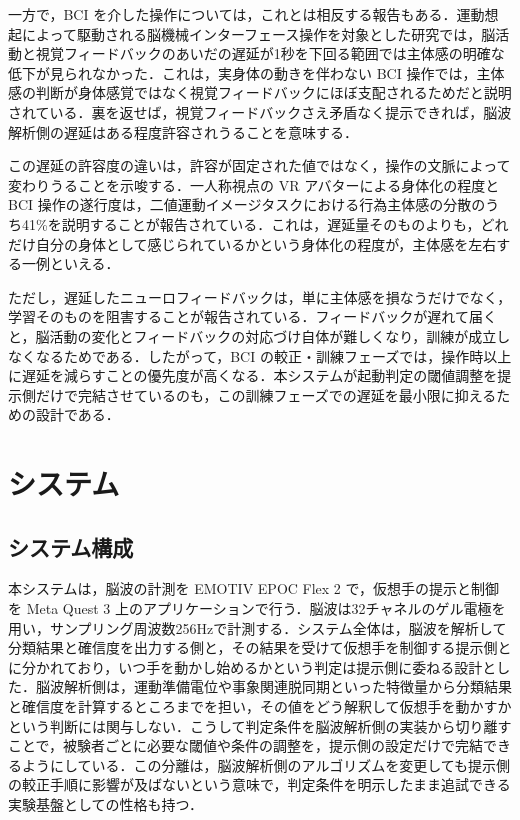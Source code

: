 \documentclass[twoside]{wiss}
\begin{document}
一方で，BCI を介した操作については，これとは相反する報告もある．運動想起によって駆動される脳機械インターフェース操作を対象とした研究では，脳活動と視覚フィードバックのあいだの遅延が1秒を下回る範囲では主体感の明確な低下が見られなかった．これは，実身体の動きを伴わない BCI 操作では，主体感の判断が身体感覚ではなく視覚フィードバックにほぼ支配されるためだと説明されている\cite{evans2015}．裏を返せば，視覚フィードバックさえ矛盾なく提示できれば，脳波解析側の遅延はある程度許容されうることを意味する．

この遅延の許容度の違いは，許容が固定された値ではなく，操作の文脈によって変わりうることを示唆する．一人称視点の VR アバターによる身体化の程度と BCI 操作の遂行度は，二値運動イメージタスクにおける行為主体感の分散のうち41\%を説明することが報告されている\cite{ziadeh2021}．これは，遅延量そのものよりも，どれだけ自分の身体として感じられているかという身体化の程度が，主体感を左右する一例といえる．

ただし，遅延したニューロフィードバックは，単に主体感を損なうだけでなく，学習そのものを阻害することが報告されている\cite{belinskaia2020}．フィードバックが遅れて届くと，脳活動の変化とフィードバックの対応づけ自体が難しくなり，訓練が成立しなくなるためである．したがって，BCI の較正・訓練フェーズでは，操作時以上に遅延を減らすことの優先度が高くなる．本システムが起動判定の閾値調整を提示側だけで完結させているのも，この訓練フェーズでの遅延を最小限に抑えるための設計である．

\section{システム}

\subsection{システム構成}

本システムは，脳波の計測を EMOTIV EPOC Flex 2 で，仮想手の提示と制御を Meta Quest 3 上のアプリケーションで行う．脳波は32チャネルのゲル電極を用い，サンプリング周波数256Hzで計測する．システム全体は，脳波を解析して分類結果と確信度を出力する側と，その結果を受けて仮想手を制御する提示側とに分かれており，いつ手を動かし始めるかという判定は提示側に委ねる設計とした．脳波解析側は，運動準備電位や事象関連脱同期といった特徴量から分類結果と確信度を計算するところまでを担い，その値をどう解釈して仮想手を動かすかという判断には関与しない．こうして判定条件を脳波解析側の実装から切り離すことで，被験者ごとに必要な閾値や条件の調整を，提示側の設定だけで完結できるようにしている．この分離は，脳波解析側のアルゴリズムを変更しても提示側の較正手順に影響が及ばないという意味で，判定条件を明示したまま追試できる実験基盤としての性格も持つ．
\end{document}

